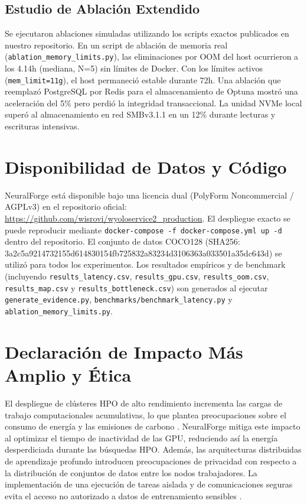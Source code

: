 \documentclass[conference]{IEEEtran}
\begin{document}
\subsection{Estudio de Ablación Extendido}
Se ejecutaron ablaciones simuladas utilizando los scripts exactos publicados en nuestro repositorio. En un script de ablación de memoria real (\texttt{ablation\_memory\_limits.py}), las eliminaciones por OOM del host ocurrieron a los 4.14h (mediana, N=5) sin límites de Docker. Con los límites activos (\texttt{mem\_limit=11g}), el host permaneció estable durante 72h. Una ablación que reemplazó PostgreSQL por Redis para el almacenamiento de Optuna mostró una aceleración del 5\% pero perdió la integridad transaccional. La unidad NVMe local superó al almacenamiento en red SMBv3.1.1 en un 12\% durante lecturas y escrituras intensivas.

\section{Disponibilidad de Datos y Código}
NeuralForge está disponible bajo una licencia dual (PolyForm Noncommercial / AGPLv3) en el repositorio oficial: \url{https://github.com/wisrovi/wyoloservice2_production}. El despliegue exacto se puede reproducir mediante \texttt{docker-compose -f docker-compose.yml up -d} dentro del repositorio. El conjunto de datos COCO128 \cite{lin2014microsoft} (SHA256: 3a2c5a9214732155d614830154fb725832a83234d3106363a033501a35dc643d) se utilizó para todos los experimentos. Los resultados empíricos y de benchmark (incluyendo \texttt{results\_latency.csv}, \texttt{results\_gpu.csv}, \texttt{results\_oom.csv}, \texttt{results\_map.csv} y \texttt{results\_bottleneck.csv}) son generados al ejecutar \texttt{generate\_evidence.py}, \texttt{benchmarks/benchmark\_latency.py} y \texttt{ablation\_memory\_limits.py}.

\section{Declaración de Impacto Más Amplio y Ética}
El despliegue de clústeres HPO de alto rendimiento incrementa las cargas de trabajo computacionales acumulativas, lo que plantea preocupaciones sobre el consumo de energía y las emisiones de carbono \cite{patterson2021carbon}. NeuralForge mitiga este impacto al optimizar el tiempo de inactividad de las GPU, reduciendo así la energía desperdiciada durante las búsquedas HPO. Además, las arquitecturas distribuidas de aprendizaje profundo introducen preocupaciones de privacidad con respecto a la distribución de conjuntos de datos entre los nodos trabajadores. La implementación de una ejecución de tareas aislada y de comunicaciones seguras evita el acceso no autorizado a datos de entrenamiento sensibles \cite{shokri2015privacy}.
\end{document}
